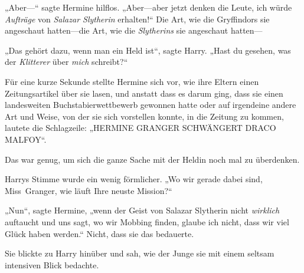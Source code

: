 „Aber—“ sagte Hermine hilflos. „Aber—aber jetzt denken die Leute, ich würde \emph{Aufträge} von \emph{Salazar Slytherin} erhalten!“ Die Art, wie die Gryffindors sie angeschaut hatten—die Art, wie die \emph{Slytherins} sie angeschaut hatten—

„Das gehört dazu, wenn man ein Held ist“, sagte Harry. „Hast du gesehen, was der \emph{Klitterer} über \emph{mich} schreibt?“

Für eine kurze Sekunde stellte Hermine sich vor, wie ihre Eltern einen Zeitungsartikel über sie lasen, und anstatt dass es darum ging, dass sie einen landesweiten Buchstabierwettbewerb gewonnen hatte oder auf irgendeine andere Art und Weise, von der sie sich vorstellen konnte, in die Zeitung zu kommen, lautete die Schlagzeile: „HERMINE GRANGER SCHWÄNGERT DRACO MALFOY“.

Das war genug, um sich die ganze Sache mit der Heldin noch mal zu überdenken.

Harrys Stimme wurde ein wenig förmlicher. „Wo wir gerade dabei sind, Miss~Granger, wie läuft Ihre neuste Mission?“

„Nun“, sagte Hermine, „wenn der Geist von Salazar Slytherin nicht \emph{wirklich} auftaucht und uns sagt, wo wir Mobbing finden, glaube ich nicht, dass wir viel Glück haben werden.“ Nicht, dass sie das bedauerte.

Sie blickte zu Harry hinüber und sah, wie der Junge sie mit einem seltsam intensiven Blick bedachte.


